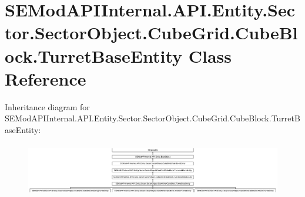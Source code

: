 \hypertarget{class_s_e_mod_a_p_i_internal_1_1_a_p_i_1_1_entity_1_1_sector_1_1_sector_object_1_1_cube_grid_1_18bc384bbaf571fbfc8546173f456649e}{}\section{S\+E\+Mod\+A\+P\+I\+Internal.\+A\+P\+I.\+Entity.\+Sector.\+Sector\+Object.\+Cube\+Grid.\+Cube\+Block.\+Turret\+Base\+Entity Class Reference}
\label{class_s_e_mod_a_p_i_internal_1_1_a_p_i_1_1_entity_1_1_sector_1_1_sector_object_1_1_cube_grid_1_18bc384bbaf571fbfc8546173f456649e}
Inheritance diagram for S\+E\+Mod\+A\+P\+I\+Internal.\+A\+P\+I.\+Entity.\+Sector.\+Sector\+Object.\+Cube\+Grid.\+Cube\+Block.\+Turret\+Base\+Entity\+:\begin{figure}[H]
\begin{center}
\leavevmode
\includegraphics[height=2.380085cm]{class_s_e_mod_a_p_i_internal_1_1_a_p_i_1_1_entity_1_1_sector_1_1_sector_object_1_1_cube_grid_1_18bc384bbaf571fbfc8546173f456649e}
\end{center}
\end{figure}
